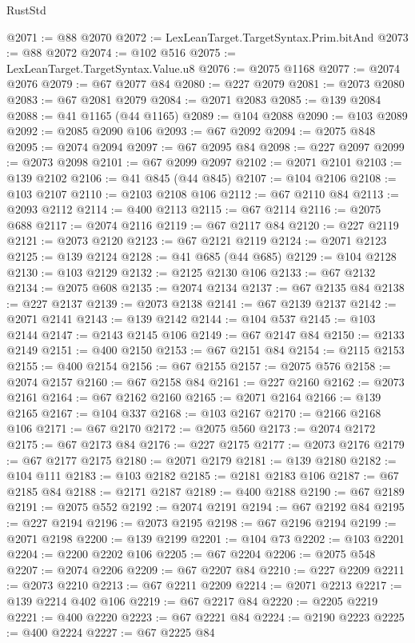 \begin{lexlean}{RustStd}
\begin{coremodule}
@2071 := @88 @2070
@2072 := LexLeanTarget.TargetSyntax.Prim.bitAnd
@2073 := @88 @2072
@2074 := @102 @516
@2075 := LexLeanTarget.TargetSyntax.Value.u8
@2076 := @2075 @1168
@2077 := @2074 @2076
@2079 := @67 @2077 @84
@2080 := @227 @2079
@2081 := @2073 @2080
@2083 := @67 @2081 @2079
@2084 := @2071 @2083
@2085 := @139 @2084
@2088 := @41 @1165 (@44 @1165)
@2089 := @104 @2088
@2090 := @103 @2089
@2092 := @2085 @2090 @106
@2093 := @67 @2092
@2094 := @2075 @848
@2095 := @2074 @2094
@2097 := @67 @2095 @84
@2098 := @227 @2097
@2099 := @2073 @2098
@2101 := @67 @2099 @2097
@2102 := @2071 @2101
@2103 := @139 @2102
@2106 := @41 @845 (@44 @845)
@2107 := @104 @2106
@2108 := @103 @2107
@2110 := @2103 @2108 @106
@2112 := @67 @2110 @84
@2113 := @2093 @2112
@2114 := @400 @2113
@2115 := @67 @2114
@2116 := @2075 @688
@2117 := @2074 @2116
@2119 := @67 @2117 @84
@2120 := @227 @2119
@2121 := @2073 @2120
@2123 := @67 @2121 @2119
@2124 := @2071 @2123
@2125 := @139 @2124
@2128 := @41 @685 (@44 @685)
@2129 := @104 @2128
@2130 := @103 @2129
@2132 := @2125 @2130 @106
@2133 := @67 @2132
@2134 := @2075 @608
@2135 := @2074 @2134
@2137 := @67 @2135 @84
@2138 := @227 @2137
@2139 := @2073 @2138
@2141 := @67 @2139 @2137
@2142 := @2071 @2141
@2143 := @139 @2142
@2144 := @104 @537
@2145 := @103 @2144
@2147 := @2143 @2145 @106
@2149 := @67 @2147 @84
@2150 := @2133 @2149
@2151 := @400 @2150
@2153 := @67 @2151 @84
@2154 := @2115 @2153
@2155 := @400 @2154
@2156 := @67 @2155
@2157 := @2075 @576
@2158 := @2074 @2157
@2160 := @67 @2158 @84
@2161 := @227 @2160
@2162 := @2073 @2161
@2164 := @67 @2162 @2160
@2165 := @2071 @2164
@2166 := @139 @2165
@2167 := @104 @337
@2168 := @103 @2167
@2170 := @2166 @2168 @106
@2171 := @67 @2170
@2172 := @2075 @560
@2173 := @2074 @2172
@2175 := @67 @2173 @84
@2176 := @227 @2175
@2177 := @2073 @2176
@2179 := @67 @2177 @2175
@2180 := @2071 @2179
@2181 := @139 @2180
@2182 := @104 @111
@2183 := @103 @2182
@2185 := @2181 @2183 @106
@2187 := @67 @2185 @84
@2188 := @2171 @2187
@2189 := @400 @2188
@2190 := @67 @2189
@2191 := @2075 @552
@2192 := @2074 @2191
@2194 := @67 @2192 @84
@2195 := @227 @2194
@2196 := @2073 @2195
@2198 := @67 @2196 @2194
@2199 := @2071 @2198
@2200 := @139 @2199
@2201 := @104 @73
@2202 := @103 @2201
@2204 := @2200 @2202 @106
@2205 := @67 @2204
@2206 := @2075 @548
@2207 := @2074 @2206
@2209 := @67 @2207 @84
@2210 := @227 @2209
@2211 := @2073 @2210
@2213 := @67 @2211 @2209
@2214 := @2071 @2213
@2217 := @139 @2214 @402 @106
@2219 := @67 @2217 @84
@2220 := @2205 @2219
@2221 := @400 @2220
@2223 := @67 @2221 @84
@2224 := @2190 @2223
@2225 := @400 @2224
@2227 := @67 @2225 @84

\end{coremodule}
\end{lexlean}
